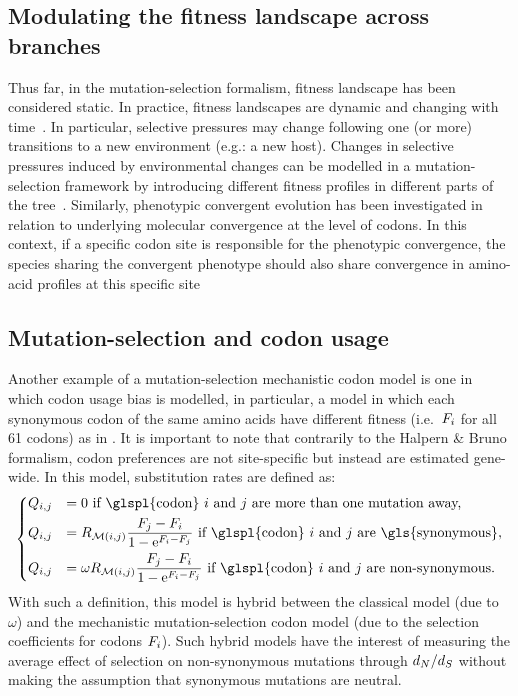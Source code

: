 \subsection{Modulating the fitness landscape across branches}
\label{subsec:modulating-the-fitness-landscape-across-branches}

Thus far, in the mutation-selection formalism, fitness landscape has been considered static.
In practice, fitness landscapes are dynamic and changing with time~\citep{Naumenko2012, Bazykin2015}.
In particular, selective pressures may change following one (or more) transitions to a new environment (e.g.: a new host).
Changes in selective pressures induced by environmental changes can be modelled in a mutation-selection framework by introducing different fitness profiles in different parts of the tree~\citep{Tamuri2009}.
Similarly, phenotypic convergent evolution has been investigated in relation to underlying molecular convergence at the level of \glspl{codon}.
In this context, if a specific \gls{codon} site is responsible for the phenotypic convergence, the species sharing the convergent \gls{phenotype} should also share convergence in amino-acid profiles at this specific site~\citep{Parto2017,Parto2018}

\subsection{Mutation-selection and codon usage}
\label{subsec:model-codon-usage}

Another example of a mutation-selection mechanistic \gls{codon} model is one in which \gls{codon usage bias} is modelled, in particular, a model in which each \gls{synonymous} \gls{codon} of the same amino acids have different fitness (i.e.~$F_{{i}}$ for all 61 codons) as in \citet{Yang2008}.
It is important to note that contrarily to the Halpern \& Bruno formalism, \gls{codon} preferences are not site-specific but instead are estimated gene-wide.
In this model, \gls{substitution} rates are defined as:
\begin{equation}
    \begin{dcases}
        \submatrix_{\itoj} & = 0 \text{ if \glspl{codon} $\ci$ and $\cj$ are more than one mutation away,} \\
        \submatrix_{\itoj} & = \mutmatrix_{\nucitoj} \dfrac{\Fitcj - \Fitci}{1 - \e^{\Fitci - \Fitcj} }\text{ if \glspl{codon} $\ci$ and $\cj$ are \gls{synonymous},} \\
        \submatrix_{\itoj} & = \omega \mutmatrix_{\nucitoj} \dfrac{\Fitcj - \Fitci}{1 - \e^{\Fitci - \Fitcj} } \text{ if \glspl{codon} $\ci$ and $\cj$ are non-synonymous}.
    \end{dcases}
    \label{eq:yang-codon-models}
\end{equation}
With such a definition, this model is hybrid between the classical model (due to $\omega$) and the mechanistic mutation-selection \gls{codon} model (due to the selection coefficients for \glspl{codon} $F_{{i}}$).
Such hybrid models have the interest of measuring the average effect of selection on \gls{non-synonymous} mutations through $d_N / d_S$ without making the assumption that \gls{synonymous} mutations are \gls{neutral}.


